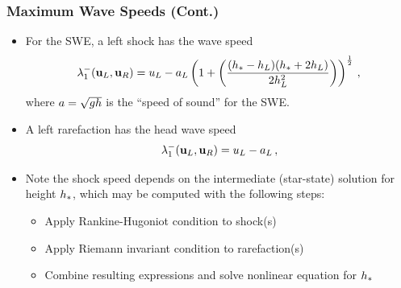 \begin{frame}
\frametitle{Maximum Wave Speeds (Cont.)}

\begin{itemize}
  \item For the SWE, a left \textcolor{secondarycolorheavy}{shock} has the wave speed
\begin{equation}\label{eq:left_shockspeed}
  \lambda_1^-(\mathbf{u}_L, \mathbf{u}_R)
    = u_L - a_L\left(1 + \left(
    \frac{(h_* - h_L)(h_* + 2h_L)}{2h_L^2}\right)\right)^{\frac{1}{2}}
    \,,
\end{equation}
    where $a=\sqrt{gh}$ is the ``speed of sound'' for the SWE.
  \item A left \textcolor{secondarycolorheavy}{rarefaction} has the head wave speed
\begin{equation}\label{eq:leftwavespeed_rarefaction}
  \lambda_1^-(\mathbf{u}_L, \mathbf{u}_R)
    = u_L - a_L
    \,,
\end{equation}
  \item Note the shock speed depends on the intermediate (star-state) solution
    for height $h_*$, which may be computed with the following steps:
    \begin{itemize}
      \item Apply Rankine-Hugoniot condition to shock(s)
      \item Apply Riemann invariant condition to rarefaction(s)
      \item Combine resulting expressions and solve nonlinear equation for
        $h_*$
    \end{itemize}
\end{itemize}

\end{frame}
